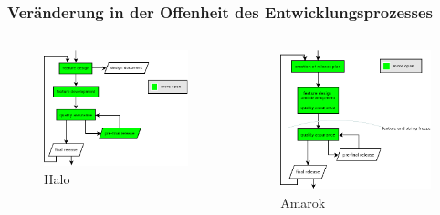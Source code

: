 \documentclass{beamer}
\begin{document}
\begin{frame}
\frametitle{Ver\"anderung in der Offenheit des Entwicklungsprozesses}
\begin{columns}
   \begin{figure}[h!]
    \centering
    \includegraphics[scale=0.25,keepaspectratio=true]{./ReleaseProcessHaloNew.png}
    \caption{Halo}
   \end{figure}
   \begin{figure}[h!]
    \centering
    \includegraphics[scale=0.25,keepaspectratio=true]{./ReleaseProcessAmarokNew.png}
    \caption{Amarok}
   \end{figure}
\end{columns}
\end{frame}
\end{document}
